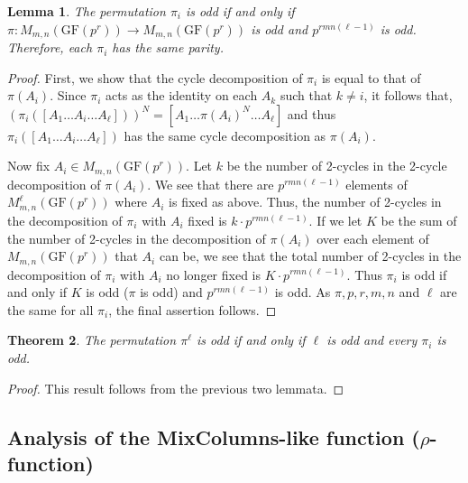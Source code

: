 \documentclass[11pt]{amsart}
\newcommand{\GF}{\mathrm{GF}}
\newtheorem{theorem}{{\bf Theorem }}
\newtheorem{lemma}[theorem]{{\bf Lemma }}
\begin{document}
\begin{lemma}
The permutation $\pi_i$ is odd if and only if $\pi: M_{m,n}(\GF(p^r)) \to M_{m,n}(\GF(p^r))$ is odd and $p^{rmn(\ell -1)}$ is odd. Therefore, each $\pi_i$ has the same parity.
\end{lemma}
\begin{proof}
First, we show that the cycle decomposition of $\pi_i$ is equal to that of $\pi(A_i)$. Since $\pi_i$ acts as the identity on each $A_k$ such that $k \neq i$, it follows that,\
$(\pi_i([A_1 \dots A_i \dots A_\ell]))^N = [A_1 \dots \pi(A_i)^N \dots A_\ell]$ and thus\\
$\pi_i([A_1 \dots A_i \dots A_\ell])$ has the same cycle decomposition as $\pi(A_i)$.\

Now fix $A_i \in M_{m,n}(\GF(p^r))$. Let $k$ be the number of 2-cycles in the 2-cycle decomposition of $\pi(A_i)$. We see that there are $p^{rmn(\ell - 1)}$ elements of $M^\ell_{m,n}(\GF(p^r))$ where $A_i$ is fixed as above. Thus, the number of 2-cycles in the decomposition of $\pi_i$ with $A_i$ fixed is $k \cdot p^{rmn(\ell - 1)}$. If we let $K$ be the sum of the number of 2-cycles in the decomposition of $\pi(A_i)$ over each element of $M_{m,n}(\GF(p^r))$ that $A_i$ can be, we see that the total number of 2-cycles in the decomposition of $\pi_i$ with $A_i$ no longer fixed is $K \cdot p^{rmn(\ell -1)}$. Thus $\pi_i$ is odd if and only if $K$ is odd ($\pi$ is odd) and $p^{rmn(\ell -1)}$ is odd. As $\pi, p, r, m, n$ and $\ell$ are the same for all $\pi_i$, the final assertion follows.
\end{proof}

\begin{theorem}
The permutation $\pi^\ell$ is odd if and only if $\ell$ is odd and every $\pi_i$ is odd.
\end{theorem}
\begin{proof}
This result follows from the previous two lemmata.
\end{proof}




\subsection{{\bf Analysis of the MixColumns-like function}  ($\rho$-function) }
\end{document}
